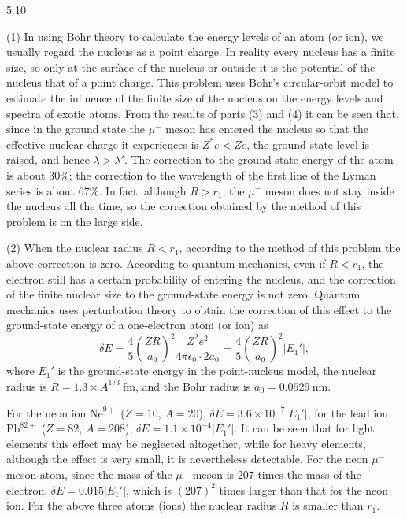 \begin{solution}{5.10}
\begin{commentary}
(1) In using Bohr theory to calculate the energy levels of an atom (or ion), we usually regard
the nucleus as a point charge. In reality every nucleus has a finite size, so only at the
surface of the nucleus or outside it is the potential of the nucleus that of a point charge.
This problem uses Bohr's circular-orbit model to estimate the influence of the finite size of
the nucleus on the energy levels and spectra of exotic atoms. From the results of parts (3)
and (4) it can be seen that, since in the ground state the $\mu^-$ meson has entered the
nucleus so that the effective nuclear charge it experiences is $Z^*e<Ze$, the ground-state
level is raised, and hence $\lambda>\lambda'$. The correction to the ground-state energy of the
atom is
about $30\%$; the correction to the wavelength of the first line of the Lyman series is about
$67\%$. In fact, although $R>r_1$, the $\mu^-$ meson does not stay inside the nucleus all the
time, so the correction obtained by the method of this problem is on the large side.

(2) When the nuclear radius $R<r_1$, according to the method of this problem the above
correction is zero. According to quantum mechanics, even if $R<r_1$, the electron still has a
certain probability of entering the nucleus, and the correction of the finite nuclear size to
the ground-state energy is not zero. Quantum mechanics uses perturbation
theory to obtain the correction of this effect to the ground-state energy of a one-electron
atom (or ion) as
\begin{equation*}
\delta E=\frac{4}{5}\left(\frac{ZR}{a_0}\right)^2\frac{Z^2e^2}{4\pi\epsilon_0\cdot 2a_0}
=\frac{4}{5}\left(\frac{ZR}{a_0}\right)^2\left|E_1'\right|,
\end{equation*}
where $E_1'$ is the ground-state energy in the point-nucleus model, the nuclear radius is
$R=1.3\times A^{1/3}\ \mathrm{fm}$, and the Bohr radius is $a_0=0.0529\ \mathrm{nm}$.

For the neon ion $\mathrm{Ne}^{9+}$ ($Z=10$, $A=20$), $\delta E=3.6\times10^{-7}|E_1'|$; for the
lead ion $\mathrm{Pb}^{82+}$ ($Z=82$, $A=208$), $\delta E=1.1\times10^{-4}|E_1'|$. It can be
seen that for light elements this effect may be neglected altogether, while for heavy elements,
although the effect is very small, it is nevertheless detectable. For the neon $\mu^-$ meson
atom, since the mass of the $\mu^-$ meson is 207 times the mass of the electron,
$\delta E=0.015|E_1'|$, which is $(207)^2$ times larger than that for the neon ion. For the
above three atoms (ions) the nuclear radius $R$ is smaller than $r_1$.


\end{commentary}
\end{solution}
